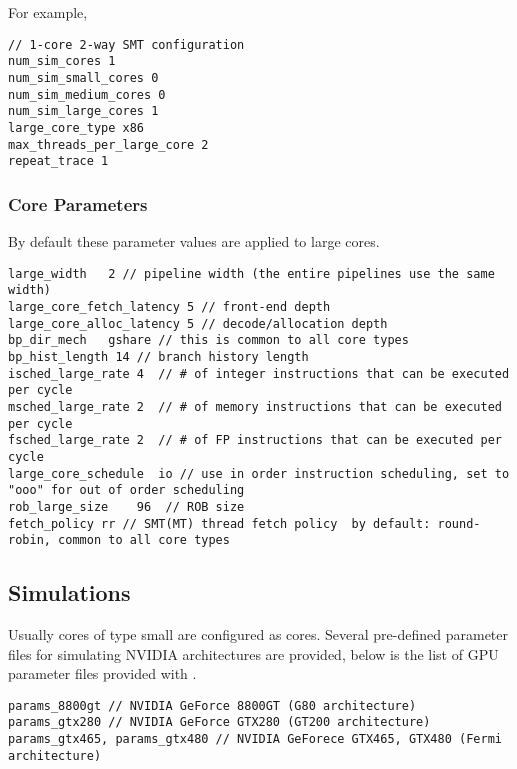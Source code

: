 \noindent
For example,

\begin{Verbatim}
// 1-core 2-way SMT configuration
num_sim_cores 1
num_sim_small_cores 0
num_sim_medium_cores 0
num_sim_large_cores 1
large_core_type x86
max_threads_per_large_core 2
repeat_trace 1
\end{Verbatim}



\subsubsection{\cpu Core Parameters}

By default these parameter values are applied to large cores. 

\begin{Verbatim}
large_width   2 // pipeline width (the entire pipelines use the same width) 
large_core_fetch_latency 5 // front-end depth 
large_core_alloc_latency 5 // decode/allocation depth  
bp_dir_mech   gshare // this is common to all core types
bp_hist_length 14 // branch history length 
isched_large_rate 4  // # of integer instructions that can be executed per cycle 
msched_large_rate 2  // # of memory instructions that can be executed per cycle 
fsched_large_rate 2  // # of FP instructions that can be executed per cycle 
large_core_schedule  io // use in order instruction scheduling, set to "ooo" for out of order scheduling 
rob_large_size    96  // ROB size
fetch_policy rr // SMT(MT) thread fetch policy  by default: round-robin, common to all core types 
\end{Verbatim}



\subsection{\gpu Simulations}

Usually cores of type small are configured as \gpu cores. Several pre-defined
parameter files for simulating NVIDIA architectures are provided, below is the
list of GPU parameter files provided with \SIM.

\begin{Verbatim}
params_8800gt // NVIDIA GeForce 8800GT (G80 architecture)
params_gtx280 // NVIDIA GeForce GTX280 (GT200 architecture)
params_gtx465, params_gtx480 // NVIDIA GeForece GTX465, GTX480 (Fermi architecture)
\end{Verbatim}


